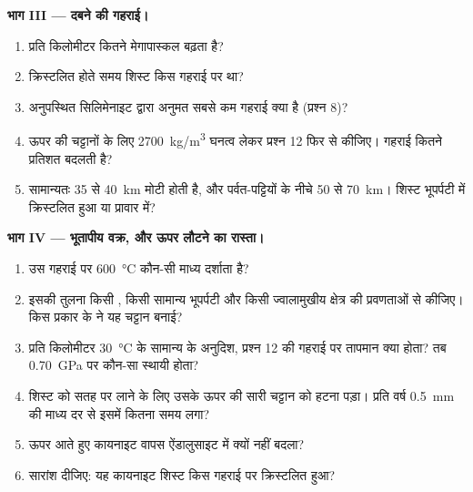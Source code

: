 \begin{problem}[{सप्ताहांत समस्या --- एक कायनाइट शिस्ट का इतिहास}]
\medskip
\noindent\textbf{भाग III --- दबने की गहराई।}
\begin{enumerate}[resume]
  \item {} प्रति किलोमीटर कितने मेगापास्कल
        बढ़ता है?
  \item क्रिस्टलित होते समय शिस्ट किस गहराई पर था?
  \item अनुपस्थित सिलिमेनाइट द्वारा अनुमत सबसे कम गहराई क्या है
        (प्रश्न 8)?
  \item ऊपर की चट्टानों के लिए \qty{2700}{kg/m^3} घनत्व लेकर प्रश्न 12 फिर से कीजिए।
        गहराई कितने प्रतिशत बदलती है?
  \item {} सामान्यतः 35 से \qty{40}{km} मोटी होती है, और
        पर्वत-पट्टियों के नीचे 50 से \qty{70}{km}। शिस्ट
        भूपर्पटी में क्रिस्टलित हुआ या प्रावार में?
\end{enumerate}

\medskip
\noindent\textbf{भाग IV --- भूतापीय वक्र, और ऊपर लौटने का रास्ता।}
\begin{enumerate}[resume]
  \item उस गहराई पर \qty{600}{\celsius} कौन-सी माध्य 
        दर्शाता है?
  \item इसकी तुलना किसी , किसी सामान्य भूपर्पटी और किसी ज्वालामुखीय
        क्षेत्र की प्रवणताओं से कीजिए। किस प्रकार के  ने यह चट्टान बनाई?
  \item प्रति किलोमीटर \qty{30}{\celsius} के सामान्य  के अनुदिश, प्रश्न 12 की
        गहराई पर तापमान क्या होता? तब \qty{0.70}{GPa} पर कौन-सा
         स्थायी होता?
  \item शिस्ट को सतह पर लाने के लिए उसके ऊपर की सारी चट्टान को हटना
        पड़ा। प्रति वर्ष \qty{0.5}{mm} की माध्य दर से इसमें कितना समय
        लगा?
  \item ऊपर आते हुए कायनाइट वापस ऐंडालुसाइट में क्यों नहीं बदला?
  \item सारांश दीजिए: यह कायनाइट शिस्ट किस गहराई पर क्रिस्टलित हुआ?
\end{enumerate}
\end{problem}
